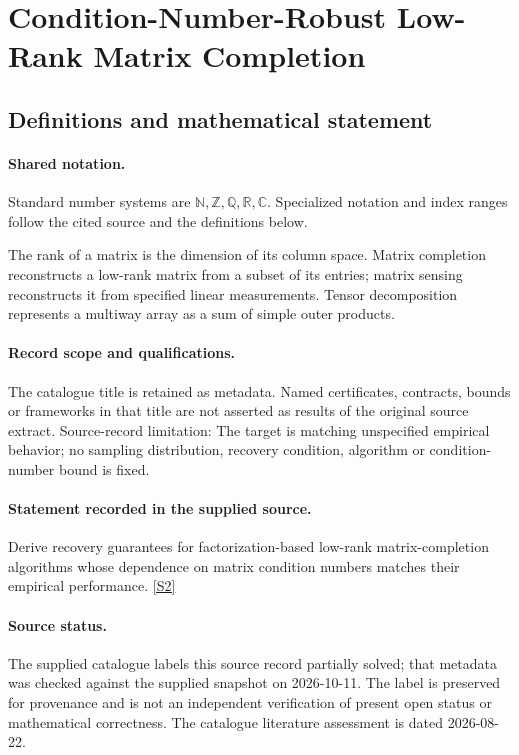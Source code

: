 \documentclass[11pt]{article}
\newcommand{\sref}[2]{\hyperlink{source:#1:#2}{[S#2]}}
\begin{document}
\section{Condition-Number-Robust Low-Rank Matrix Completion}\label{statement}

\subsection{Definitions and mathematical statement}

\paragraph{Shared notation.}Standard number systems are $\mathbb N,\mathbb Z,\mathbb Q,\mathbb R,\mathbb C$. Specialized notation and index ranges follow the cited source and the definitions below.


The rank of a matrix is the dimension of its column space. Matrix completion reconstructs a low-rank matrix from a subset of its entries; matrix sensing reconstructs it from specified linear measurements. Tensor decomposition represents a multiway array as a sum of simple outer products.
\paragraph{Record scope and qualifications.}
The catalogue title is retained as metadata. Named certificates, contracts, bounds or frameworks in that title are not asserted as results of the original source extract.
Source-record limitation: The target is matching unspecified empirical behavior; no sampling distribution, recovery condition, algorithm or condition-number bound is fixed.
\paragraph{Statement recorded in the supplied source.}
Derive recovery guarantees for factorization-based low-rank matrix-completion algorithms whose dependence on matrix condition numbers matches their empirical performance. \sref{statement}{2}
\paragraph{Source status.}
The supplied catalogue labels this source record partially solved; that metadata was checked against the supplied snapshot on 2026-10-11. The label is preserved for provenance and is not an independent verification of present open status or mathematical correctness. The catalogue literature assessment is dated 2026-08-22.
\end{document}
